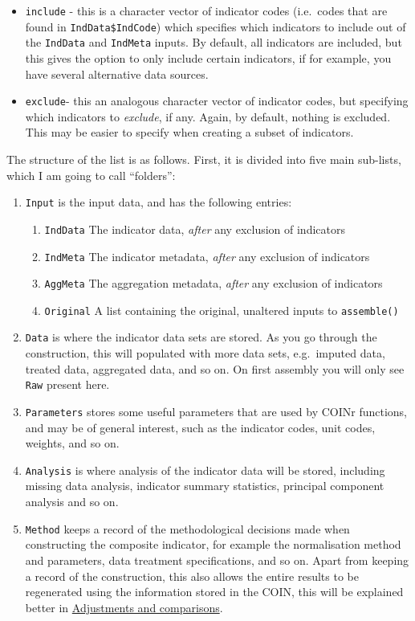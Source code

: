 \documentclass[
]{book}
\providecommand{\tightlist}{%
  \setlength{\itemsep}{0pt}\setlength{\parskip}{0pt}}
\begin{document}
\begin{itemize}
\tightlist
\item
  \texttt{include} - this is a character vector of indicator codes (i.e.~codes that are found in \texttt{IndData\$IndCode}) which specifies which indicators to include out of the \texttt{IndData} and \texttt{IndMeta} inputs. By default, all indicators are included, but this gives the option to only include certain indicators, if for example, you have several alternative data sources.
\item
  \texttt{exclude}- this an analogous character vector of indicator codes, but specifying which indicators to \emph{exclude}, if any. Again, by default, nothing is excluded. This may be easier to specify when creating a subset of indicators.
\end{itemize}

The structure of the list is as follows. First, it is divided into five main sub-lists, which I am going to call ``folders'':

\begin{enumerate}
\def\labelenumi{\arabic{enumi}.}
\tightlist
\item
  \texttt{Input} is the input data, and has the following entries:

  \begin{enumerate}
  \def\labelenumii{(\alph{enumii})}
  \tightlist
  \item
    \texttt{IndData} The indicator data, \emph{after} any exclusion of indicators
  \item
    \texttt{IndMeta} The indicator metadata, \emph{after} any exclusion of indicators
  \item
    \texttt{AggMeta} The aggregation metadata, \emph{after} any exclusion of indicators
  \item
    \texttt{Original} A list containing the original, unaltered inputs to \texttt{assemble()}
  \end{enumerate}
\item
  \texttt{Data} is where the indicator data sets are stored. As you go through the construction, this will populated with more data sets, e.g.~imputed data, treated data, aggregated data, and so on. On first assembly you will only see \texttt{Raw} present here.
\item
  \texttt{Parameters} stores some useful parameters that are used by COINr functions, and may be of general interest, such as the indicator codes, unit codes, weights, and so on.
\item
  \texttt{Analysis} is where analysis of the indicator data will be stored, including missing data analysis, indicator summary statistics, principal component analysis and so on.
\item
  \texttt{Method} keeps a record of the methodological decisions made when constructing the composite indicator, for example the normalisation method and parameters, data treatment specifications, and so on. Apart from keeping a record of the construction, this also allows the entire results to be regenerated using the information stored in the COIN, this will be explained better in \protect\hyperlink{adjustments-and-comparisons}{Adjustments and comparisons}.
\end{enumerate}
\end{document}
